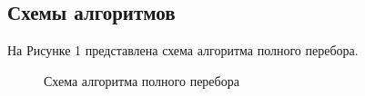 \documentclass[14pt, a4paper]{extarticle}
\begin{document}
	\subsection{Схемы алгоритмов}
	На Рисунке 1 представлена схема алгоритма полного перебора.
	\begin{figure}[h!]
		\caption{Схема алгоритма полного перебора}
	\end{figure}
	\clearpage
	
\end{document}
